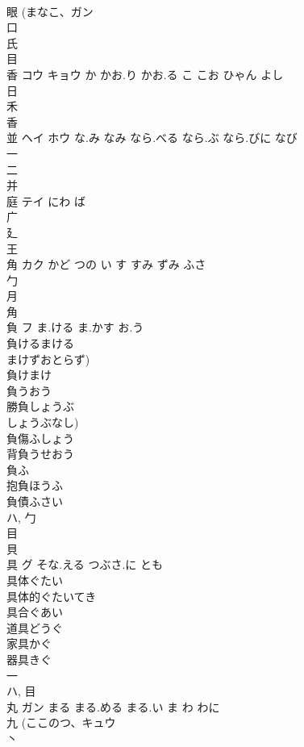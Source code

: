 \documentclass[8pt]{extreport}
\begin{document}
\begin{CJK}{UTF8}{min}
\\	眼 (まなこ、ガン 
\\	口 
\\	氏 
\\	目 
\\	香	コウ キョウ	か かお.り かお.る こ こお ひゃん よし	
\\	日 
\\	禾 
\\	香 
\\	並	ヘイ ホウ	な.み なみ なら.べる なら.ぶ なら.びに なび	
\\	一 
\\	二 
\\	并	
\\	庭	テイ	にわ ば	
\\	广 
\\	廴 
\\	王 
\\	角	カク	かど つの い す すみ ずみ ふさ	
\\	勹 
\\	月 
\\	角 
\\	負	フ	ま.ける ま.かす お.う	
\\	負けるまける
\\	まけずおとらず) 
\\	負けまけ
\\	負うおう
\\	勝負しょうぶ
\\	しょうぶなし) 
\\	負傷ふしょう
\\	背負うせおう
\\	負ふ
\\	抱負ほうふ
\\	負債ふさい
\\	ハ, 勹 
\\	目 
\\	貝 
\\	具	グ	そな.える つぶさ.に とも	
\\	具体ぐたい 
\\	具体的ぐたいてき 
\\	具合ぐあい 
\\	道具どうぐ 
\\	家具かぐ 
\\	器具きぐ 
\\	一 
\\	ハ, 目 
\\	丸	ガン	まる まる.める まる.い ま わ わに	
\\	九 (ここのつ、キュウ 
\\	丶 

\end{CJK}
\end{document}
